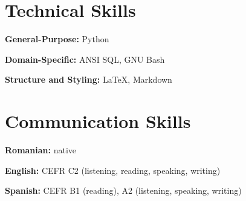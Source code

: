 \documentclass[a4paper,11pt]{article}
\begin{document}
\section{Technical Skills}
    \begin{itemize}[leftmargin=0.15in, label={}, itemsep=-3pt]
        \small{
            \item{\textbf{General-Purpose:} Python}
            \item{\textbf{Domain-Specific:} ANSI SQL, GNU Bash}
            \item{\textbf{Structure and Styling:} \LaTeX, Markdown}
        }
    \end{itemize}

\section{Communication Skills}
    \begin{itemize}[leftmargin=0.15in, label={}, itemsep=-3pt]
        \small{
            \item{\textbf{Romanian:} native}
            \item{\textbf{English:} CEFR C2 (listening, reading, speaking, writing)}
            \item{\textbf{Spanish:} CEFR B1 (reading), A2 (listening, speaking, writing)}
        }
    \end{itemize}

\end{document}

